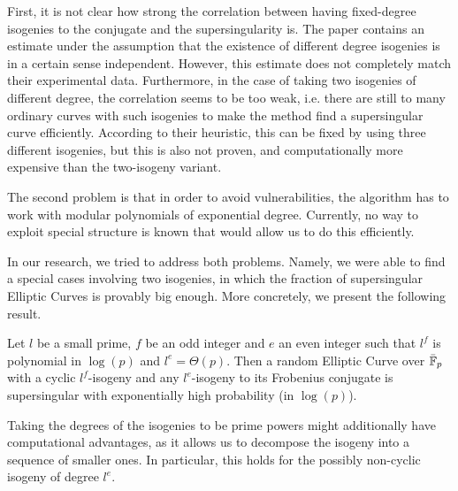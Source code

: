 First, it is not clear how strong the correlation between having fixed-degree isogenies to the conjugate and the supersingularity is.
The paper contains an estimate under the assumption that the existence of different degree isogenies is in a certain sense independent.
However, this estimate does not completely match their experimental data.
Furthermore, in the case of taking two isogenies of different degree, the correlation seems to be too weak, i.e. there are still to many ordinary curves with such isogenies to make the method find a supersingular curve efficiently.
According to their heuristic, this can be fixed by using three different isogenies, but this is also not proven, and computationally more expensive than the two-isogeny variant.

The second problem is that in order to avoid vulnerabilities, the algorithm has to work with modular polynomials of exponential degree.
Currently, no way to exploit special structure is known that would allow us to do this efficiently.

In our research, we tried to address both problems.
Namely, we were able to find a special cases involving two isogenies, in which the fraction of supersingular Elliptic Curves is provably big enough.
More concretely, we present the following result.
\begin{prop}
    Let $l$ be a small prime, $f$ be an odd integer and $e$ an even integer such that $l^f$ is polynomial in $\log(p)$ and $l^e = \Theta(p)$.
    Then a random Elliptic Curve over $\bar{\mathbb{F}}_p$ with a cyclic $l^f$-isogeny and any $l^e$-isogeny to its Frobenius conjugate is supersingular with exponentially high probability (in $\log(p)$).
\end{prop}
Taking the degrees of the isogenies to be prime powers might additionally have computational advantages, as it allows us to decompose the isogeny into a sequence of smaller ones.
In particular, this holds for the possibly non-cyclic isogeny of degree $l^e$.


